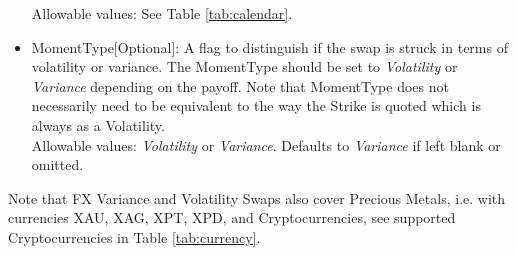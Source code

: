 \begin{itemize}
	Allowable values: See Table \ref{tab:calendar}.	
	\item MomentType[Optional]: A flag to distinguish if the swap is struck in terms of volatility or variance. The MomentType should be set to \emph{Volatility} or \emph{Variance} depending on the payoff.  Note that MomentType does not necessarily need to be equivalent to the way the Strike is quoted which is always as a Volatility.\\
	Allowable values: \emph{Volatility} or \emph{Variance}. Defaults to \emph{Variance} if left blank or omitted.
\end{itemize}

Note that FX Variance and Volatility Swaps also cover Precious Metals, i.e. with
currencies XAU, XAG, XPT, XPD, and Cryptocurrencies,  see supported Cryptocurrencies in Table \ref{tab:currency}.
